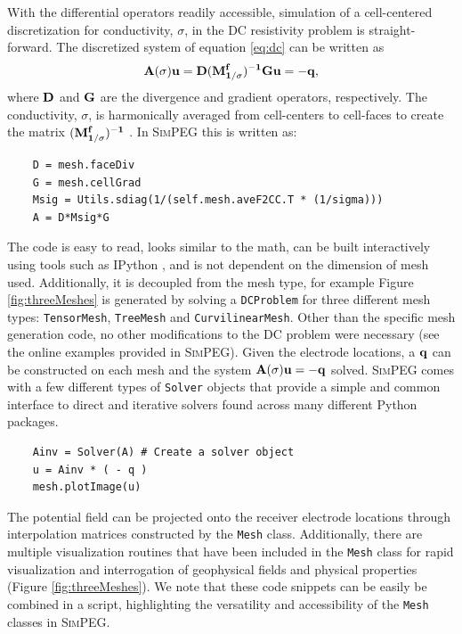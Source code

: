 \documentclass[preprint,review,3p,times,onecolumn,authoryear]{elsarticle}
\newcommand{\SimPEG}{\textsc{SimPEG}\xspace}
\newcommand{\Mesh}{\texttt{Mesh}\xspace}
\renewcommand {\u}  { {\mathbf u} }
\begin{document}
With the differential operators readily accessible, simulation of a cell-centered
discretization for conductivity, $\sigma$, in the DC resistivity problem is straight-forward.
The discretized system of equation \ref{eq:dc} can be written as
{%
\begin{equation}
    \bf A(\sigma) \u = D (M_{1/\sigma}^f)^{-1} G \u = - q,
\end{equation}
}
where $\bf D$ and $\bf G$ are the divergence and gradient operators, respectively. The conductivity, $\sigma$, is harmonically averaged from cell-centers to cell-faces to create the matrix $\bf (M_{1/\sigma}^f)^{-1}$ \citep{Pidlisecky2007}. In \SimPEG this is written as:
{%
{\scriptsize\begin{verbatim}
    D = mesh.faceDiv
    G = mesh.cellGrad
    Msig = Utils.sdiag(1/(self.mesh.aveF2CC.T * (1/sigma)))
    A = D*Msig*G
\end{verbatim}}
}
The code is easy to read, looks similar to the math, can be built interactively
using tools such as IPython \citep{Perez2007}, and is not dependent on the dimension of mesh used. Additionally, it is decoupled from the mesh type, for example Figure \ref{fig:threeMeshes} is generated by solving a \texttt{DCProblem} for three different mesh types: \texttt{TensorMesh}, \texttt{TreeMesh} and \texttt{CurvilinearMesh}. Other than the specific mesh generation code, no other modifications to the DC problem were necessary (see the online examples provided in \SimPEG).
Given the electrode locations, a $\bf q$ can be constructed on each mesh and the system
$\bf A(\sigma) \u = - q$
solved.
\SimPEG comes with a few different types of \texttt{Solver} objects that provide
a simple and common interface to direct and iterative solvers found across many different Python packages.
{%
{\scriptsize\begin{verbatim}
    Ainv = Solver(A) # Create a solver object
    u = Ainv * ( - q )
    mesh.plotImage(u)
\end{verbatim}}
}
The potential field can be projected onto the receiver electrode locations
through interpolation matrices constructed by the \Mesh class.
Additionally, there are multiple visualization routines that have
been included in the \Mesh class for rapid visualization and
interrogation of geophysical fields and physical properties (Figure \ref{fig:threeMeshes}).
We note that these code snippets can be easily be combined in a script, highlighting the
versatility and accessibility of the \Mesh classes in \SimPEG.
\end{document}

